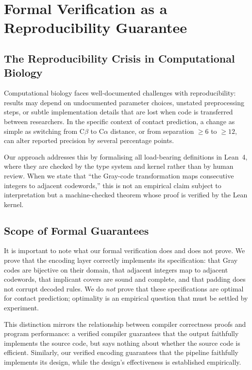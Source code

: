 \section{Formal Verification as a Reproducibility Guarantee}
\label{sec:methods-reproducibility}

\subsection{The Reproducibility Crisis in Computational Biology}
Computational biology faces well-documented challenges with reproducibility:
results may depend on undocumented parameter choices, unstated preprocessing
steps, or subtle implementation details that are lost when code is transferred
between researchers.  In the specific context of contact prediction, a change
as simple as switching from C$\beta$ to C$\alpha$ distance, or from separation
$\geq 6$ to $\geq 12$, can alter reported precision by several percentage
points.

Our approach addresses this by formalising all load-bearing definitions in
Lean~4, where they are checked by the type system and kernel rather than by
human review.  When we state that ``the Gray-code transformation maps
consecutive integers to adjacent codewords,'' this is not an empirical claim
subject to interpretation but a machine-checked theorem whose proof is
verified by the Lean kernel.

\subsection{Scope of Formal Guarantees}
It is important to note what our formal verification does and does not prove.
We prove that the encoding layer correctly implements its specification:
that Gray codes are bijective on their domain, that adjacent integers map to
adjacent codewords, that implicant covers are sound and complete, and that
padding does not corrupt decoded rules.  We do \emph{not} prove that these
specifications are optimal for contact prediction; optimality is an empirical
question that must be settled by experiment.

This distinction mirrors the relationship between compiler correctness proofs
and program performance: a verified compiler guarantees that the output
faithfully implements the source code, but says nothing about whether the
source code is efficient.  Similarly, our verified encoding guarantees that
the pipeline faithfully implements its design, while the design's effectiveness
is established empirically.


